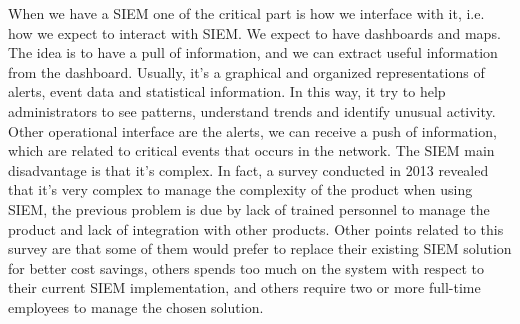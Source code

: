 \documentclass[11pt]{article}
\begin{document}
When we have a SIEM one of the critical part is how we interface with it, i.e. how we expect to interact with SIEM. We expect to have dashboards and maps. The idea is to have a pull of information, and we can extract useful information from the dashboard. Usually, it's a graphical and organized representations of alerts, event data and statistical information. In this way, it try to help administrators to see patterns, understand trends and identify unusual activity. Other operational interface are the alerts, we can receive a push of information, which are related to critical events that occurs in the network. The SIEM main disadvantage is that it's complex. In fact, a survey conducted in 2013 revealed that it's very complex to manage the complexity of the product when using SIEM, the previous problem is due by lack of trained personnel to manage the product and lack of integration with other products. Other points related to this survey are that some of them would prefer to replace their existing SIEM solution for better cost savings, others spends too much on the system with respect to their current SIEM implementation, and others require two or more full-time employees to manage the chosen solution.
\end{document}
